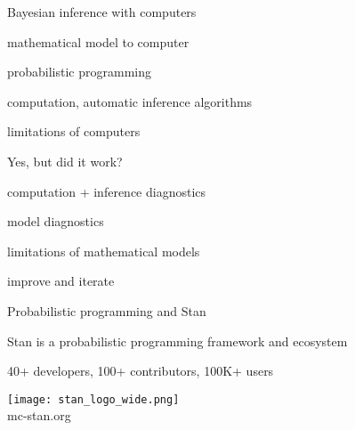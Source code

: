 \documentclass[english,t]{beamer}
\begin{document}
\begin{frame}{Bayesian inference with computers}

  \vspace{\baselineskip}
\hspace{1cm}  \begin{minipage}[t]{0.8\linewidth}
  mathematical model to computer
      \vspace{\baselineskip}

probabilistic programming
      \vspace{\baselineskip}

computation, automatic inference algorithms
      \vspace{\baselineskip}

limitations of computers
\end{minipage}

\end{frame}

\begin{frame}{Yes, but did it work?}

  \vspace{\baselineskip}
\hspace{1cm}  \begin{minipage}[t]{0.8\linewidth}
computation + inference diagnostics
      \vspace{\baselineskip}

model diagnostics
      \vspace{\baselineskip}

limitations of mathematical models
      \vspace{\baselineskip}

improve and iterate
\end{minipage}

\end{frame}

\begin{frame}{Probabilistic programming and Stan}

  Stan is a probabilistic programming framework and ecosystem

  40+ developers, 100+ contributors, 100K+ users

  \center
  \vspace{\baselineskip}
  \texttt{[image: stan\_logo\_wide.png]}\\
  mc-stan.org
  
\end{frame}
\end{document}
